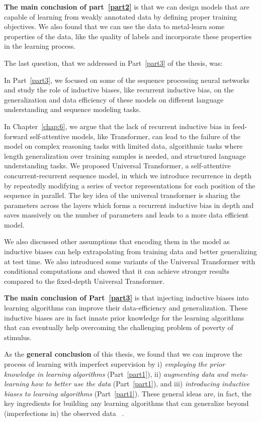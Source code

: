 \textbf{The main conclusion of part~\ref{part2}} is that we can design models that are capable of learning from weakly annotated data by defining proper training objectives. We also found that we can use the data to metal-learn some properties of the data, like the quality of labels and incorporate these properties in the learning process.

\bigskip
The last question, that we addressed in Part~\ref{part3} of the thesis, was:
%

In Part~\ref{part3}, we focused on some of the sequence processing neural networks and study the role of inductive biases, like recurrent inductive bias, on the generalization and data efficiency of these models on different language understanding and sequence modeling tasks.

In Chapter~\ref{chap:6}, we argue that the lack of recurrent inductive bias in feed-forward self-attentive models, like Transformer, can lead to the failure of the model on complex reasoning tasks with limited data, algorithmic tasks where length generalization over training samples is needed, and structured language understanding tasks. We proposed Universal Transformer, a self-attentive concurrent-recurrent sequence model, in which we introduce recurrence in depth by repeatedly modifying a series of vector representations for each position of the sequence in parallel. The key idea of the universal transformer is sharing the parameters across the layers which forms a recurrent inductive bias in depth and saves massively on the number of parameters and leads to a more data efficient model. 

We also discussed other assumptions that encoding them in the model as inductive biases can help extrapolating from training data and better generalizing at test time.  We also introduced some variants of the Universal Transformer with conditional computations and showed that it can achieve stronger results compared to the fixed-depth Universal Transformer.

\textbf{The main conclusion of Part~\ref{part3}} is that injecting inductive biases into learning algorithms can improve their data-efficiency and generalization. These inductive biases are in fact innate prior knowledge for the learning algorithms that can eventually help overcoming the challenging problem of poverty of stimulus.

\bigskip
As the \textbf{general conclusion} of this thesis, we found that we can improve the process of learning with imperfect supervision by i) \emph{employing the prior knowledge in learning algorithms} (Part~\ref{part1}), ii) \emph{augmenting data and meta-learning how to better use the data} (Part~\ref{part1}), and iii) \emph{introducing inductive biases to learning algorithms} (Part~\ref{part1}). 
%
These general ideas are, in fact, the key ingredients for building any learning algorithms that can generalize beyond (imperfections in) the observed data ~\citep{Mitchell80theneed}.

